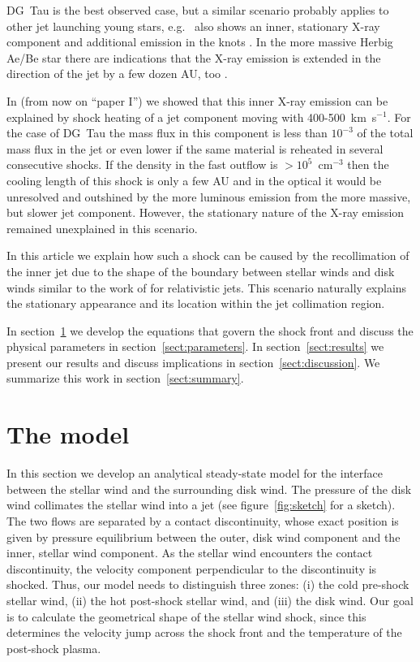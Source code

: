 \documentclass[manuscript]{aastex}
\begin{document}
DG~Tau is the best observed case, but a similar scenario probably applies to other jet launching young stars, e.g.\  also shows an inner, stationary X-ray component and additional emission in the knots \citep{2010A&A...511A..42B,2011A&A...530A.123S}.
In the more massive Herbig Ae/Be star  there are indications that the X-ray emission is extended in the direction of the jet by a few dozen AU, too \citep{2005ApJ...628..811S,2013A&A...552A.142G}.

In \citet{2009A&A...493..579G} (from now on ``paper I'') we showed that this inner X-ray emission can be explained by shock heating of a jet component moving with 400-500~km~s$^{-1}$. For the case of DG~Tau the mass flux in this component is less than $10^{-3}$ of the total mass flux in the jet or even lower if the same material is reheated in several consecutive shocks. If the density in the fast outflow is $>10^5$~cm$^{-3}$ then the cooling length of this shock is only a few AU and in the optical it would be unresolved and outshined by the more luminous emission from the more massive, but slower jet component. However, the stationary nature of the X-ray emission remained unexplained in this scenario.

In this article we explain how such a shock can be caused by the recollimation of the inner jet due to the shape of the boundary between stellar winds and disk winds similar to the work of \citet{2012MNRAS.422.2282K} for relativistic jets. This scenario naturally explains the stationary appearance and its location within the jet collimation region. 



In section~\ref{sect:model} we develop the equations that govern the shock front and discuss the physical parameters in section~\ref{sect:parameters}. In section~\ref{sect:results} we present our results and discuss implications in section~\ref{sect:discussion}. We summarize this work in section~\ref{sect:summary}.

\section{The model}
\label{sect:model}
In this section we develop an analytical steady-state model for the interface between the stellar wind and the surrounding disk wind. The pressure of the disk wind collimates the stellar wind into a jet (see figure~\ref{fig:sketch} for a sketch). The two flows are separated by a contact discontinuity, whose exact position is given by pressure equilibrium between the outer, disk wind component and the inner, stellar wind component. As the stellar wind encounters the contact discontinuity, the velocity component perpendicular to the discontinuity is shocked. Thus, our model needs to distinguish three zones: (i) the cold pre-shock stellar wind, (ii) the hot post-shock stellar wind, and (iii) the disk wind. Our goal is to calculate the geometrical shape of the stellar wind shock, since this determines the velocity jump across the shock front and the temperature of the post-shock plasma. 
\end{document}
